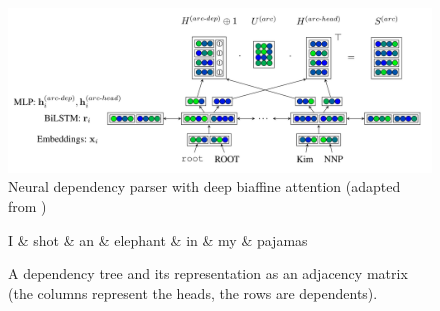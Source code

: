 \begin{figure}[t]
    \includegraphics[width=\textwidth]{img/biaffine-parser.png}
    \caption{Neural dependency parser with deep biaffine attention (adapted from \cite{dozat:biaffine:2017})}
    \label{fig:biaffine-parser}
\end{figure}

\begin{figure}[t]
    \begin{minipage}[b]{0.50\linewidth}
        \centering
        \begin{dependency}
            \begin{deptext}
            I \& shot \& an \& elephant \& in \& my \& pajamas \\
            \end{deptext}
        \end{dependency}
    \end{minipage}%
    \begin{minipage}[b]{0.50\linewidth}
        \centering
    \end{minipage}
    \caption{A dependency tree and its representation as an adjacency matrix (the columns represent the heads, the rows are dependents).}
    \label{fig:deptree-vs-matrix}
\end{figure}

